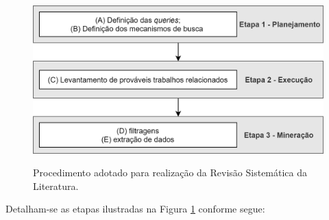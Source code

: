\begin{figure}[H]
\centering
\caption{Procedimento adotado para realização da Revisão Sistemática da Literatura.} \includegraphics[width=12cm,height=\textwidth,keepaspectratio]{figs/processo_rev_sistematica.png}
\newline {}\label{fig:processo_rev_sistematica}
\end{figure}

Detalham-se as etapas ilustradas na Figura \ref{fig:processo_rev_sistematica} conforme segue:

